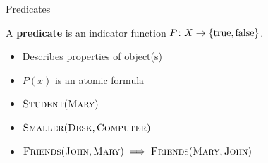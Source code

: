 \documentclass[usenames,dvipsnames,notes,11pt,aspectratio=169]{beamer}
\begin{document}
\begin{frame}
    {Predicates}

    A \textbf{predicate} is an indicator function $P\colon X\rightarrow \left\{ \text{true}, \text{false} \right\}$.\\
    \begin{itemize}
        \item Describes properties of object(s)
        \item $P(x)$ is an atomic formula
        \item[] $\textsc{Student}(\textsc{Mary})$
        \item[] $\textsc{Smaller}(\textsc{Desk}, \textsc{Computer})$
        \item[] $\textsc{Friends}(\textsc{John}, \textsc{Mary}) \implies \textsc{Friends}(\textsc{Mary}, \textsc{John})$
    \end{itemize}
\end{frame}
\end{document}
